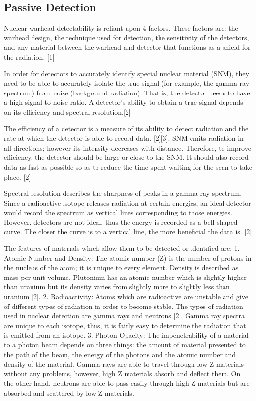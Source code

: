 \documentclass[a4paper]{article}
\begin{document}
\subsection{Passive Detection}

Nuclear warhead detectability is reliant upon 4 factors. These factors are: the warhead
design, the technique used for detection, the sensitivity of the detectors, and any material
between the warhead and detector that functions as a shield for the radiation. [1]

In order for detectors to accurately identify special nuclear material (SNM), they need to
be able to accurately isolate the true signal (for example, the gamma ray spectrum) from noise
(background radiation). That is, the detector needs to have a high signal-to-noise ratio. A
detector’s ability to obtain a true signal depends on its efficiency and spectral resolution.[2]

The efficiency of a detector is a measure of its ability to detect radiation and the rate at
which the detector is able to record data. [2][3]. SNM emits radiation in all directions; however
its intensity decreases with distance. Therefore, to improve efficiency, the detector should be
large or close to the SNM. It should also record data as fast as possible so as to reduce the time
spent waiting for the scan to take place. [2]

Spectral resolution describes the sharpness of peaks in a gamma ray spectrum. Since a
radioactive isotope releases radiation at certain energies, an ideal detector would record the
spectrum as vertical lines corresponding to those energies. However, detectors are not ideal, thus
the energy is recorded as a bell shaped curve. The closer the curve is to a vertical line, the more
beneficial the data is. [2]

The features of materials which allow them to be detected or identified are:
1. Atomic Number and Density: The atomic number (Z) is the number of protons in
the nucleus of the atom; it is unique to every element. Density is described as mass
per unit volume. Plutonium has an atomic number which is slightly higher than
uranium but its density varies from slightly more to slightly less than uranium [2].
2. Radioactivity: Atoms which are radioactive are unstable and give of different
types of radiation in order to become stable. The types of radiation used in nuclear
detection are gamma rays and neutrons [2]. Gamma ray spectra are unique to each
isotope, thus, it is fairly easy to determine the radiation that is emitted from an isotope.
3. Photon Opacity: The impenetrability of a material to a photon beam depends on
three things: the amount of material presented to the path of the beam, the energy of
the photons and the atomic number and density of the material. Gamma rays are able
to travel through low Z materials without any problems, however, high Z materials
absorb and deflect them. On the other hand, neutrons are able to pass easily through
high Z materials but are absorbed and scattered by low Z materials.
\end{document}

